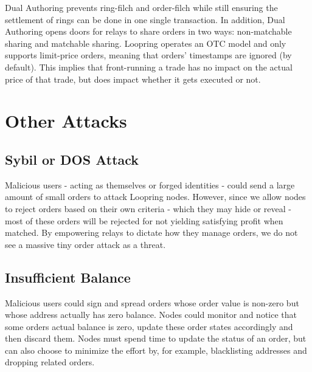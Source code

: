 \documentclass[UTF8,nofonts]{article}
\begin{document}
\begin{multicols}{2}
\begin{itemize}
\end{itemize}

Dual Authoring prevents ring-filch and order-filch while still ensuring the settlement of rings can be done in one single transaction. In addition, Dual Authoring opens doors for relays to share orders in two ways: non-matchable sharing and matchable sharing. Loopring operates an OTC model and only supports limit-price orders, meaning that orders’ timestamps are ignored (by default). This implies that front-running a trade has no impact on the actual price of that trade, but does impact whether it gets executed or not.

\section{Other Attacks}

\subsection{Sybil or DOS Attack}
Malicious users - acting as themselves or forged identities - could send a large amount of small orders to attack Loopring nodes. However, since we allow nodes to reject orders based on their own criteria - which they may hide or reveal - most of these orders will be rejected for not yielding satisfying profit when matched.  By empowering relays to dictate how they manage orders, we do not see a massive tiny order attack as a threat.

\subsection{Insufficient Balance}
Malicious users could sign and spread orders whose order value is non-zero but whose address actually has zero balance. Nodes could monitor and notice that some orders actual balance is zero, update these order states accordingly and then discard them.
Nodes must spend time to update the status of an order, but can also choose to minimize the effort by, for example, blacklisting addresses and dropping related orders.


\end{multicols}
\end{document}
